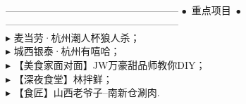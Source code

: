 \documentclass[12pt,a4paper,roman]{moderncv} %
\begin{document}
\begin{CJK*}{UTF8}{gkai}
{{\vspace*{4pt}
\\
\vspace*{4pt}
-----------------------------------------------------
$\bullet$~重点项目~$\bullet$
-----------------------------------------------------
\\ \hspace*{6mm} $\blacktriangleright$ 麦当劳·杭州潮人杯狼人杀；
\\ \hspace*{6mm} $\blacktriangleright$ 城西银泰·杭州有嘻哈；
\\ \hspace*{6mm} $\blacktriangleright$ 【美食家面对面】JW万豪甜品师教你DIY；
\\ \hspace*{6mm} $\blacktriangleright$ 【深夜食堂】林拌鲜；
\\ \hspace*{6mm} $\blacktriangleright$ 【食匠】山西老爷子--南新仓涮肉.
\\}}



\end{CJK*}
\end{document}
